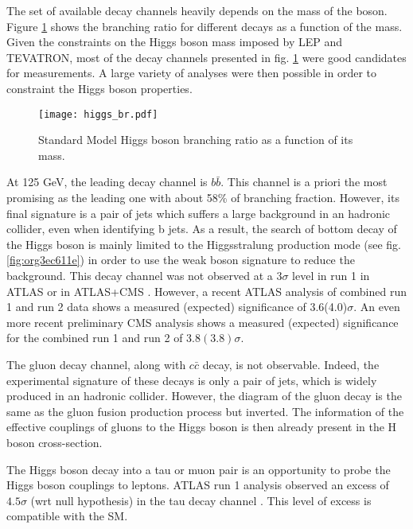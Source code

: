 \begin{enumerate}
The set of available decay channels heavily depends on the mass of the boson.
Figure \ref{fig:org6c93d9f} shows the branching ratio for different decays as a function of the mass.
Given the constraints on the Higgs boson mass imposed by LEP and TEVATRON, most of the decay channels presented in fig. \ref{fig:org6c93d9f} were good candidates for measurements.
A large variety of analyses were then possible in order to constraint the Higgs boson properties.

\begin{figure}[htbp]
\centering
\texttt{[image: higgs\_br.pdf]}
\caption{\label{fig:org6c93d9f}
Standard Model Higgs boson branching ratio as a function of its mass. \cite{CERN-2013-004}}
\end{figure}

At 125 GeV, the leading decay channel is \(b\bar{b}\).
This channel is a priori the most promising as the leading one with about 58\% of branching fraction.
However, its final signature is a pair of jets which suffers a large background in an hadronic collider, even when identifying b jets.
As a result, the search of bottom decay of the Higgs boson is mainly limited to the Higgsstralung production mode (see fig. \ref{fig:org3ec611e}) in order to use the weak boson signature to reduce the background.
This decay channel was not observed at a 3$\sigma$ level in run 1 in ATLAS \cite{ATLAS-CONF-2013-079,CERN-PH-EP-2014-214} or in ATLAS+CMS \cite{CERN-EP-2016-100}.
However, a recent ATLAS analysis \cite{CERN-EP-2017-175,CERN-EP-2017-175} of combined run 1 and run 2 data shows a measured (expected) significance of 3.6(4.0)$\sigma$.
An even more recent preliminary CMS analysis \cite{CMS-PAS-HIG-16-044} shows a measured (expected) significance for the combined run 1 and run 2 of $3.8(3.8)\sigma$.

The gluon decay channel, along with $c\bar{c}$ decay, is not observable.
Indeed, the experimental signature of these decays is only a pair of jets, which is widely produced in an hadronic collider.
However, the diagram of the gluon decay is the same as the gluon fusion production process but inverted.
The information of the effective couplings of gluons to the Higgs boson is then already present in the H boson cross-section.

The Higgs boson decay into a tau or muon pair is an opportunity to probe the Higgs boson couplings to leptons.
ATLAS run 1 analysis observed an excess of $4.5\sigma$ (wrt null hypothesis) in the tau decay channel \cite{CERN-PH-EP-2014-262}.
This level of excess is compatible with the SM.


\end{enumerate}
